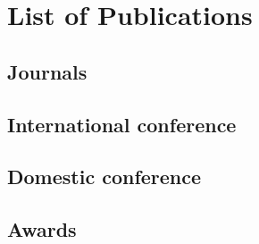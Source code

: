 \documentclass[12pt,a4paper,oneside,onecolumn,fleqn,dvipdfmx,report]{jsbook}
\begin{document}
    \chapter*{List of Publications}

        \section*{Journals}

        \section*{International conference}

        \section*{Domestic conference}

        \section*{Awards}
\end{document}
